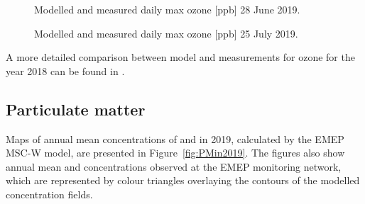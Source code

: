 \begin{figure}[H]
\caption{Modelled and measured daily max ozone [ppb] 28 June 2019.}
\label{fig:O3_20190628}
\end{figure}


\begin{figure}[H]
\caption{Modelled and measured daily max ozone [ppb] 25 July 2019.}
\label{fig:O3_20190725}
\end{figure}


A more detailed comparison between model and measurements for ozone for the year 2018 can be found in \cite{WEB2020:O3}.



\subsection{Particulate matter} 
\label{subs:PMstatus}

Maps of annual mean concentrations of \PM[10] and \PM[2.5] in 2019,
calculated by the EMEP MSC-W model, are presented in
Figure~\ref{fig:PMin2019}. The figures also show annual mean \PM[10]
and \PM[2.5] concentrations observed at the EMEP monitoring network,
which are represented by colour triangles overlaying the contours of the
modelled concentration fields.

